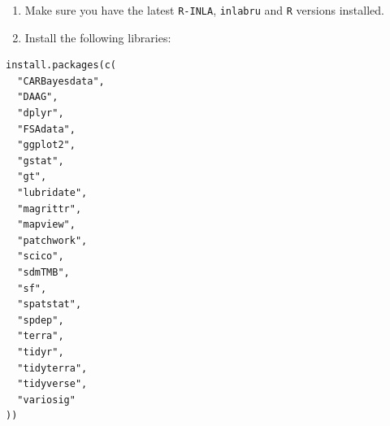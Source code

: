 \documentclass[
  letterpaper,
  DIV=11,
  numbers=noendperiod]{scrartcl}
\providecommand{\tightlist}{%
  \setlength{\itemsep}{0pt}\setlength{\parskip}{0pt}}\usepackage{longtable,booktabs,array}
\begin{document}
\begin{enumerate}
\def\labelenumi{\arabic{enumi}.}
\setcounter{enumi}{2}
\tightlist
\item
  Make sure you have the latest \texttt{R-INLA}, \texttt{inlabru} and
  \texttt{R} versions installed.
\item
  Install the following libraries:
\end{enumerate}

\begin{verbatim}
install.packages(c(
  "CARBayesdata",
  "DAAG",
  "dplyr",
  "FSAdata",
  "ggplot2",
  "gstat",
  "gt",
  "lubridate",
  "magrittr",
  "mapview",
  "patchwork",
  "scico",
  "sdmTMB",
  "sf",
  "spatstat",
  "spdep",
  "terra",
  "tidyr",
  "tidyterra",
  "tidyverse",
  "variosig"
))
\end{verbatim}
\end{document}
